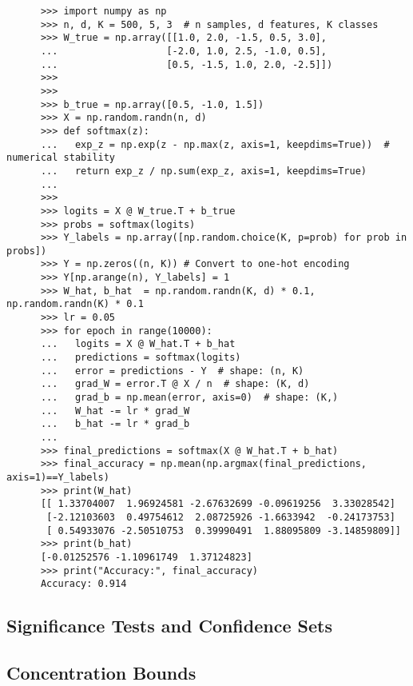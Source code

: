   \begin{example}
    \begin{lstlisting}
      >>> import numpy as np
      >>> n, d, K = 500, 5, 3  # n samples, d features, K classes
      >>> W_true = np.array([[1.0, 2.0, -1.5, 0.5, 3.0],
      ...                   [-2.0, 1.0, 2.5, -1.0, 0.5],
      ...                   [0.5, -1.5, 1.0, 2.0, -2.5]])
      >>> 
      >>> 
      >>> b_true = np.array([0.5, -1.0, 1.5])
      >>> X = np.random.randn(n, d)
      >>> def softmax(z):
      ...   exp_z = np.exp(z - np.max(z, axis=1, keepdims=True))  # numerical stability
      ...   return exp_z / np.sum(exp_z, axis=1, keepdims=True)
      ... 
      >>> 
      >>> logits = X @ W_true.T + b_true
      >>> probs = softmax(logits)
      >>> Y_labels = np.array([np.random.choice(K, p=prob) for prob in probs])
      >>> Y = np.zeros((n, K)) # Convert to one-hot encoding
      >>> Y[np.arange(n), Y_labels] = 1
      >>> W_hat, b_hat  = np.random.randn(K, d) * 0.1, np.random.randn(K) * 0.1
      >>> lr = 0.05
      >>> for epoch in range(10000):
      ...   logits = X @ W_hat.T + b_hat
      ...   predictions = softmax(logits)
      ...   error = predictions - Y  # shape: (n, K)
      ...   grad_W = error.T @ X / n  # shape: (K, d)
      ...   grad_b = np.mean(error, axis=0)  # shape: (K,)
      ...   W_hat -= lr * grad_W
      ...   b_hat -= lr * grad_b
      ... 
      >>> final_predictions = softmax(X @ W_hat.T + b_hat)
      >>> final_accuracy = np.mean(np.argmax(final_predictions, axis=1)==Y_labels)
      >>> print(W_hat)
      [[ 1.33704007  1.96924581 -2.67632699 -0.09619256  3.33028542]
       [-2.12103603  0.49754612  2.08725926 -1.6633942  -0.24173753]
       [ 0.54933076 -2.50510753  0.39990491  1.88095809 -3.14859809]]
      >>> print(b_hat)
      [-0.01252576 -1.10961749  1.37124823]
      >>> print("Accuracy:", final_accuracy)
      Accuracy: 0.914
    \end{lstlisting}
  \end{example}

\subsection{Significance Tests and Confidence Sets}

\subsection{Concentration Bounds}

